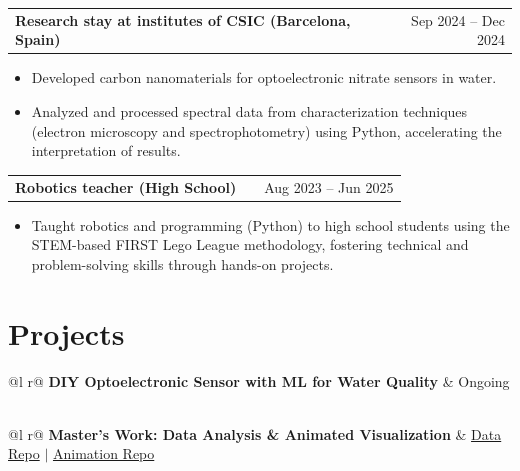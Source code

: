\documentclass[a4paper,12pt]{article}
\makeatletter
\newenvironment{joblong}[2]
    {
    \begin{tabularx}{\linewidth}{@{}l X r@{}}
    \textbf{#1} & \hfill &  #2 \\[3.75pt]
    \end{tabularx}
    \begin{minipage}[t]{\linewidth}
    \begin{itemize}[nosep,after=\strut, leftmargin=1em, itemsep=3pt,label=--]
    }
    {
    \end{itemize}
    \end{minipage}    
    }
\makeatother
\begin{document}
\begin{joblong}{Research stay at institutes of CSIC (Barcelona, Spain)}{Sep 2024 -- Dec 2024}
\item Developed carbon nanomaterials for optoelectronic nitrate sensors in water.
\item Analyzed and processed spectral data from characterization techniques (electron microscopy and spectrophotometry) using Python, accelerating the interpretation of results.
\end{joblong}

\begin{joblong}{Robotics teacher (High School)}{Aug 2023 -- Jun 2025}
\item Taught robotics and programming (Python) to high school students using the STEM-based FIRST Lego League methodology, fostering technical and problem-solving skills through hands-on projects.
\end{joblong}

\section{Projects}

\begin{tabularx}{\linewidth}{ @{}l r@{} }
\textbf{DIY Optoelectronic Sensor with ML for Water Quality} & \hfill Ongoing \\[3.75pt]
  \\
\end{tabularx}
\vspace{5pt}

\begin{tabularx}{\linewidth}{ @{}l r@{} }
\textbf{Master's Work: Data Analysis \& Animated Visualization} & \hfill \href{https://github.com/davidil98/article_data_coding}{Data Repo} $|$ \href{https://github.com/davidil98/defensa_master}{Animation Repo} \\[3.75pt]
  \\
\end{tabularx}
\vspace{5pt}
\end{document}
